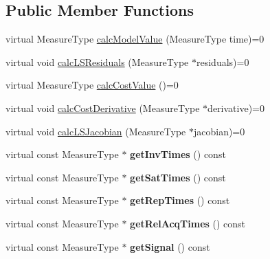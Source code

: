 \subsection*{Public Member Functions}
\begin{DoxyCompactItemize}
\item 
virtual Measure\-Type \hyperlink{class_ox_1_1_functions_t1_a2d5f4c9296daf3531e30a562348ad474}{calc\-Model\-Value} (Measure\-Type time)=0
\item 
virtual void \hyperlink{class_ox_1_1_functions_t1_a6c69a4159a92c4ddb71ecba97fcdf6de}{calc\-L\-S\-Residuals} (Measure\-Type $\ast$residuals)=0
\item 
virtual Measure\-Type \hyperlink{class_ox_1_1_functions_t1_af1475834e89c9304a96c776f3d5aacbf}{calc\-Cost\-Value} ()=0
\item 
virtual void \hyperlink{class_ox_1_1_functions_t1_a413b0afca183b88613070ae87121ca66}{calc\-Cost\-Derivative} (Measure\-Type $\ast$derivative)=0
\item 
virtual void \hyperlink{class_ox_1_1_functions_t1_a84e268911eb64919129c8a0cea39344d}{calc\-L\-S\-Jacobian} (Measure\-Type $\ast$jacobian)=0
\item 
\hypertarget{class_ox_1_1_functions_t1_a71aafa53236bc1eed5b4d65ae25538c7}{virtual const Measure\-Type $\ast$ {\bfseries get\-Inv\-Times} () const }\label{class_ox_1_1_functions_t1_a71aafa53236bc1eed5b4d65ae25538c7}

\item 
\hypertarget{class_ox_1_1_functions_t1_a62b13782ff86b039cd24b29da47fdac4}{virtual const Measure\-Type $\ast$ {\bfseries get\-Sat\-Times} () const }\label{class_ox_1_1_functions_t1_a62b13782ff86b039cd24b29da47fdac4}

\item 
\hypertarget{class_ox_1_1_functions_t1_afb89e35bedfd9d608b0afe189d976fa9}{virtual const Measure\-Type $\ast$ {\bfseries get\-Rep\-Times} () const }\label{class_ox_1_1_functions_t1_afb89e35bedfd9d608b0afe189d976fa9}

\item 
\hypertarget{class_ox_1_1_functions_t1_a142aaed9ff99a0dd08460d2581150e9c}{virtual const Measure\-Type $\ast$ {\bfseries get\-Rel\-Acq\-Times} () const }\label{class_ox_1_1_functions_t1_a142aaed9ff99a0dd08460d2581150e9c}

\item 
\hypertarget{class_ox_1_1_functions_t1_adf70d696e9da0fcdb45c4a4d02913d6c}{virtual const Measure\-Type $\ast$ {\bfseries get\-Signal} () const }\label{class_ox_1_1_functions_t1_adf70d696e9da0fcdb45c4a4d02913d6c}


\end{DoxyCompactItemize}

